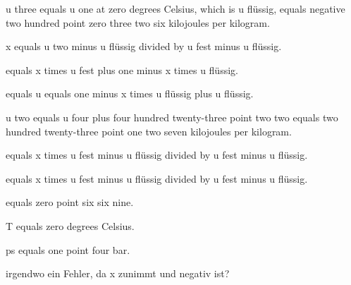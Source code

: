 u three equals u one at zero degrees Celsius, which is u flüssig, equals negative two hundred point zero three two six kilojoules per kilogram.

x equals u two minus u flüssig divided by u fest minus u flüssig.

equals x times u fest plus one minus x times u flüssig.

equals u equals one minus x times u flüssig plus u flüssig.

u two equals u four plus four hundred twenty-three point two two equals two hundred twenty-three point one two seven kilojoules per kilogram.

equals x times u fest minus u flüssig divided by u fest minus u flüssig.

equals x times u fest minus u flüssig divided by u fest minus u flüssig.

equals zero point six six nine.

T equals zero degrees Celsius.

ps equals one point four bar.

irgendwo ein Fehler, da x zunimmt und negativ ist?